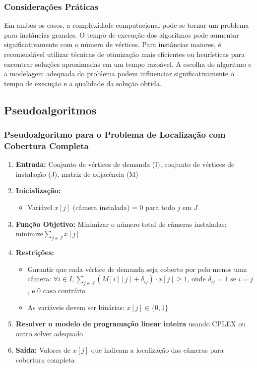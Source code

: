 \documentclass[12pt, a4paper]{report}
\begin{document}
\subsubsection{Considerações Práticas}
Em ambos os casos, a complexidade computacional pode se tornar um problema para instâncias grandes. O tempo de execução dos algoritmos pode aumentar significativamente com o número de vértices. Para instâncias maiores, é recomendável utilizar técnicas de otimização mais eficientes ou heurísticas para encontrar soluções aproximadas em um tempo razoável. A escolha do algoritmo e a modelagem adequada do problema podem influenciar significativamente o tempo de execução e a qualidade da solução obtida.

\subsection{Pseudoalgoritmos}

\subsubsection{Pseudoalgoritmo para o Problema de Localização com Cobertura Completa}
\begin{enumerate}
    \item \textbf{Entrada:} Conjunto de vértices de demanda (I), conjunto de vértices de instalação (J), matriz de adjacência (M)
    \item \textbf{Inicialização:}
    \begin{itemize}
        \item Variável \(x[j]\) (câmera instalada) = 0 para todo \(j\) em \(J\)
    \end{itemize}
    \item \textbf{Função Objetivo:} Minimizar o número total de câmeras instaladas: \(\text{minimize} \sum_{j \in J} x[j]\) \cite{veloso2021localizacao}
    \item \textbf{Restrições:}
    \begin{itemize}
        \item Garantir que cada vértice de demanda seja coberto por pelo menos uma câmera: \(\forall i \in I, \sum_{j \in J} (M[i][j] + \delta_{ij}) \cdot x[j] \geq 1\), onde \(\delta_{ij} = 1\) se \(i = j\), e 0 caso contrário
        \item As variáveis devem ser binárias: \(x[j] \in \{0, 1\}\)
    \end{itemize}
    \item \textbf{Resolver o modelo de programação linear inteira} usando CPLEX ou outro solver adequado
    \item \textbf{Saída:} Valores de \(x[j]\) que indicam a localização das câmeras para cobertura completa
\end{enumerate}
\end{document}
